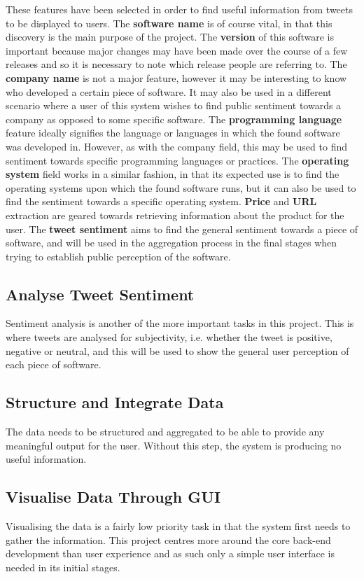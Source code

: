 These features have been selected in order to find useful information from tweets to be displayed to users. The \textbf{software name} is of course vital, in that this discovery is the main purpose of the project. The \textbf{version} of this software is important because major changes may have been made over the course of a few releases and so it is necessary to note which release people are referring to. The \textbf{company name} is not a major feature, however it may be interesting to know who developed a certain piece of software. It may also be used in a different scenario where a user of this system wishes to find public sentiment towards a company as opposed to some specific software. The \textbf{programming language} feature ideally signifies the language or languages in which the found software was developed in. However, as with the company field, this may be used to find sentiment towards specific programming languages or practices. The \textbf{operating system} field works in a similar fashion, in that its expected use is to find the operating systems upon which the found software runs, but it can also be used to find the sentiment towards a specific operating system. \textbf{Price} and \textbf{URL} extraction are geared towards retrieving information about the product for the user. The \textbf{tweet sentiment} aims to find the general sentiment towards a piece of software, and will be used in the aggregation process in the final stages when trying to establish public perception of the software.

\subsection{Analyse Tweet Sentiment}
Sentiment analysis is another of the more important tasks in this project. This is where tweets are analysed for subjectivity, i.e. whether the tweet is positive, negative or neutral, and this will be used to show the general user perception of each piece of software.

\subsection{Structure and Integrate Data}
The data needs to be structured and aggregated to be able to provide any meaningful output for the user. Without this step, the system is producing no useful information.

\subsection{Visualise Data Through GUI}
Visualising the data is a fairly low priority task in that the system first needs to gather the information. This project centres more around the core back-end development than user experience and as such only a simple user interface is needed in its initial stages.

